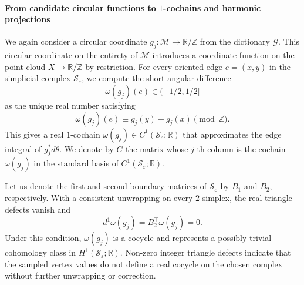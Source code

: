 \documentclass[a4paper,11pt, DIV=10]{scrartcl}
\numberwithin{equation}{section}
\theoremstyle{definition}
\theoremstyle{remark}
\newcommand{\Z}{\mathbb{Z}}
\newcommand{\R}{\mathbb{R}}
\newcommand{\mc}[1]{\mathcal{#1}}
\begin{document}
\paragraph{From candidate circular functions to $1$-cochains and harmonic projections}
We again consider a circular coordinate $g_j\colon \mc{M}\to \R/\Z$ from the dictionary $\mathcal{G}$.
This circular coordinate on the entirety of $\mc{M}$ introduces a coordinate function on the point cloud $X\to \R/\Z$ by restriction.
For every oriented edge $e=(x,y)$ in the simplicial complex $\mc{S}_\varepsilon$, we compute the short angular difference
\begin{equation}
\omega(g_j)(e)
\in (-1/2,1/2]
\end{equation}
as the unique real number satisfying
\begin{equation}
\omega(g_j)(e)
\equiv
g_j(y)-g_j(x)
\pmod{\Z}.
\end{equation}
This gives a real $1$-cochain $\omega(g_j)\in C^1(\mc{S}_\varepsilon;\R)$ that approximates the edge integral of $g_j^*d\theta$.
We denote by $G$ the matrix whose $j$-th column is the cochain $\omega(g_j)$ in the standard basis of $C^1(\mc{S}_\varepsilon;\R)$.

Let us denote the first and second boundary matrices of $\mc{S}_\varepsilon$ by $B_1$ and $B_2$, respectively.
With a consistent unwrapping on every $2$-simplex, the real triangle defects vanish and
\begin{equation}
d^1\omega(g_j)=B_2^\top \omega(g_j)=0.
\end{equation}
Under this condition, $\omega(g_j)$ is a cocycle and represents a possibly trivial cohomology class in $H^1(\mc{S}_\varepsilon;\R)$.
Non-zero integer triangle defects indicate that the sampled vertex values do not define a real cocycle on the chosen complex without further unwrapping or correction.
\end{document}
